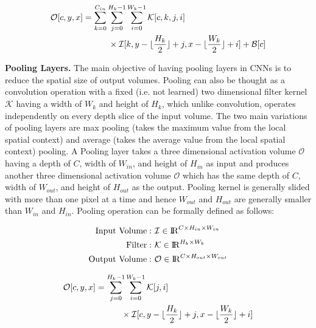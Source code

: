 \begin{equation}
\label{eqn:conv_operator}
\begin{split}
\mathcal{O}[c,y,x] &= \sum_{k=0}^{C_{in}} \sum_{j=0}^{H_k-1} \sum_{i=0}^{W_k-1} \mathcal{K}[c, k, j, i] \\ & \quad \quad \quad \times \mathcal{I}[k,y-\lfloor\frac{H_k}{2}\rfloor+j,x-\lfloor\frac{W_k}{2}\rfloor+i] + \mathcal{B}[c]
\end{split}
\end{equation}

\noindent \textbf{Pooling Layers.} The main objective of having pooling layers in CNNs is to reduce the spatial size of output volumes. Pooling can also be thought as a convolution operation with a fixed (i.e. not learned) two dimensional filter kernel $\mathcal{K}$ having a width of $W_k$ and height of $H_k$, which unlike convolution, operates independently on every depth slice of the input volume. The two main variations of pooling layers are max pooling (takes the maximum value from the local spatial context) and average (takes the average value from the local spatial context) pooling. A Pooling layer takes a three dimensional activation volume $\mathcal{O}$ having a depth of $C$, width of $W_{in}$, and height of $H_{in}$ as input and produces another three dimensional activation volume $\mathcal{O}$ which has the same depth of $C$, width of $W_{out}$, and height of $H_{out}$ as the output. Pooling kernel is generally slided with more than one pixel at a time and hence $W_{out}$ and $H_{out}$ are generally smaller than $W_{in}$ and $H_{in}$. Pooling operation can be formally defined as follows:

\vspace{-2mm}
\begin{align}
\text{Input Volume}:&~ \mathcal{I} \in \mathcal{\rm I\!R}^{C \times H_{in} \times W_{in}}\\
\text{Filter}:&~ \mathcal{K} \in \mathcal{\rm I\!R}^{H_{k} \times W_{k}}\\
\text{Output Volume}:&~ \mathcal{O} \in \mathcal{\rm I\!R}^{C \times H_{out} \times W_{out}}
\end{align}

\begin{equation}
\label{eqn:pool_operator}
\begin{split}
\mathcal{O}[c,y,x] &= \sum_{j=0}^{H_k-1} \sum_{i=0}^{W_k-1} \mathcal{K}[j, i] \\ & \quad \quad \quad \times \mathcal{I}[c,y-\lfloor\frac{H_k}{2}\rfloor+j,x-\lfloor\frac{W_k}{2}\rfloor+i]
\end{split}
\end{equation}


